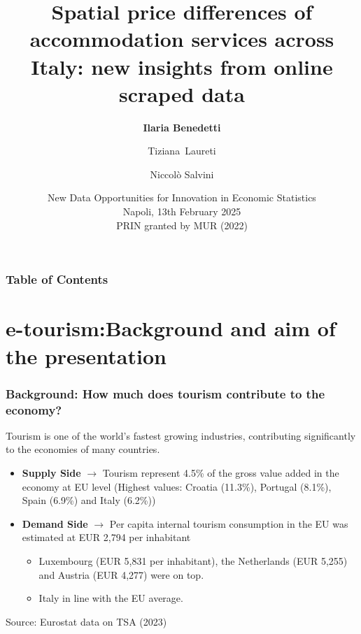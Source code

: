 \documentclass{beamer}
\title{Spatial price differences of accommodation services across Italy: new insights from online scraped data}
\subtitle{}
\author[Ilaria Benedetti] %
{\textbf{Ilaria Benedetti}\inst{1} \and Tiziana~Laureti\inst{1} \and Niccolò Salvini\inst{2} }
\institute[Unitus] %
{
  \inst{1}%
  University of Tuscia\\
  Department of Economics Engineering Society and Business Organization
}
\date[ICES] %
{New Data Opportunities for Innovation in Economic Statistics \\ Napoli, 13th February 2025 \\ \vspace{0.5cm} \scriptsize{PRIN granted by MUR (2022) }}
\begin{document}
\frame{\titlepage}
\begin{frame}
\frametitle{Table of Contents}
\tableofcontents
\end{frame}
\section{\textbf{e-tourism}:Background and aim of the presentation}
\begin{frame}

\frametitle{Background: How much does tourism contribute to the economy?}
Tourism is one of the world’s fastest growing industries, contributing significantly to the economies of many countries.
\vspace{0.5cm}
\begin{itemize}
\item \textbf{Supply Side} $\rightarrow$ Tourism represent 4.5\% of the gross value added in the economy at EU level (Highest values: Croatia (11.3\%), Portugal (8.1\%), Spain (6.9\%) and Italy (6.2\%))

\vspace{0.2 cm}
\item \textbf{Demand Side}   $\rightarrow$  Per capita internal tourism consumption in the EU was estimated at EUR 2,794 per inhabitant 
\begin{itemize}
    \item [\ding{51}]  Luxembourg (EUR 5,831 per inhabitant), the Netherlands (EUR 5,255) and Austria (EUR 4,277) were on top.
    \item [\ding{51}] Italy in line with the EU average. 
\end{itemize}
\end{itemize}
\vspace{0.6 cm}
\tiny Source: Eurostat data on TSA (2023)
\end{frame}
\end{document}
